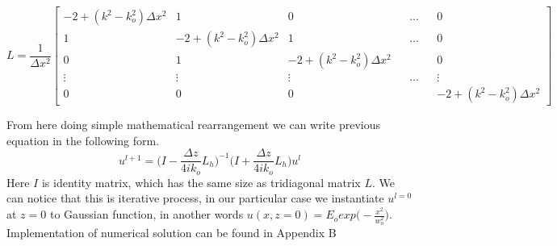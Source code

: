 \documentclass[a4paper]{article}
\begin{document}
	\setlength\arraycolsep{-4.5pt}
	\[ L = \frac{1}{\Delta x^2}\begin{bmatrix}
    -2+(k^2-k_o^2)\Delta x^2& 1& 0& &\dots& & 0 \\
    1 & -2+(k^2-k_o^2)\Delta x^2 & 1& &\dots& & 0 \\
    0 &     1& -2+(k^2-k_o^2)\Delta x^2 & & & & 0 \\
    \vdots & \vdots & \vdots & &\dots& & \vdots \\
    0& 0& 0& && &     -2+(k^2-k_o^2)\Delta x^2
	\end{bmatrix}\]
	
	
	\noindent From here doing simple mathematical rearrangement we can write previous equation in the following form.
		\[u^{l+1} = \bigg(I-\frac{\Delta z}{4ik_o}L_h\bigg)^{-1}\bigg(I+\frac{\Delta z}{4ik_o}L_h\bigg) u^l\]
	Here $I$ is identity matrix, which has the same size as tridiagonal matrix $L$. We can notice that this is iterative process, in our particular case we instantiate $u^{l=0}$ at $z = 0$ to Gaussian function, in another words $u(x,z=0)= E_oexp\big(-\frac{x^2}{w_o^2}\big)$. Implementation of numerical solution can be found in Appendix B
	
\end{document}
